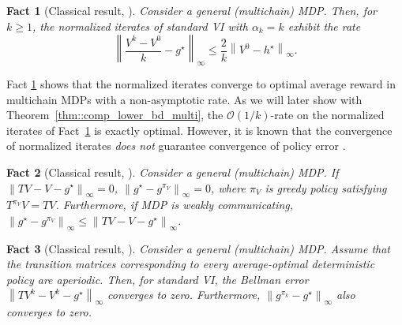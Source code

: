 \documentclass{article} %
\newcommand*{\infn}[1]{\left\|{#1}\right\|_{\infty}}
\newtheorem{fact}{Fact}
\begin{document}
\begin{fact}[Classical result, ]\label{fact::vi_normalized_iterate}
Consider a general (multichain) MDP. Then, for $k \ge 1$, the normalized iterates of standard VI with $\alpha_k=k$ exhibit the rate
\[\infn{\frac{V^k-V^0}{k}-g^{\star}} \le \frac{2}{k}\infn{V^0-h^{\star}}.\]
\end{fact}

Fact \ref{fact::vi_normalized_iterate} shows that the normalized iterates converge to optimal average reward in multichain MDPs with a non-asymptotic rate. As we will later show with Theorem~\ref{thm::comp_lower_bd_multi}, the $\mathcal{O}(1/k)$-rate on the normalized iterates of Fact~\ref{fact::vi_normalized_iterate} is exactly optimal. However, it is known that the convergence of normalized iterates \emph{does not} guarantee convergence of policy error \citep[Example~4]{della2012illustrated}. 


\begin{fact}[Classical result, ]\label{fact:Bellman-to-policy}
Consider a general (multichain) MDP. If $\infn{TV-V-g^{\star}}=0$, $\infn{g^{\star}-g^{\pi_V}}=0$, where $\pi_V$ is greedy policy satisfying $T^{\pi_V}V= TV$. Furthermore, if MDP is weakly communicating, $\infn{g^{\star}-g^{\pi_V}} \le \infn{TV-V-g^{\star}}$.
\end{fact}
\begin{fact}[Classical result,  ]\label{fact::vi_Bellman_error} 
Consider a general (multichain) MDP. Assume that the transition matrices corresponding to every average-optimal deterministic policy are aperiodic. Then, for standard VI, the Bellman error $\infn{TV^k-V^k-g^{\star}}$ converges to zero. Furthermore, $\infn{g^{\pi_k}-g^{\star}}$ also  converges to zero. 
\end{fact}



\end{document}

